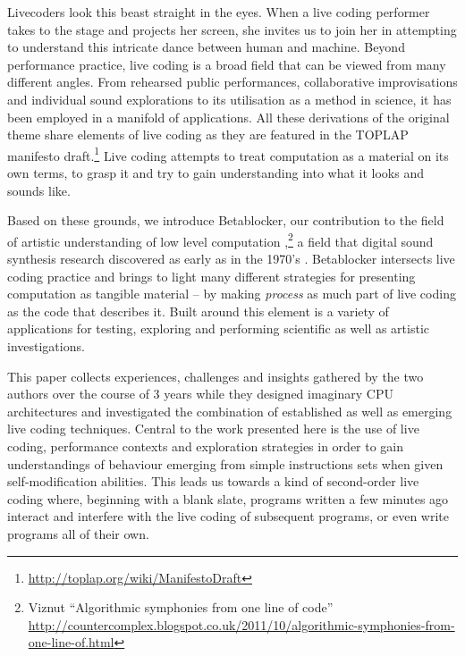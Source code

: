 \documentclass[letterpaper, 12pt]{article}
\begin{document}
Livecoders look this beast straight in the eyes.
When a live coding performer takes to the stage and projects her screen, she invites us to join her in attempting to understand this intricate dance between human and machine.
Beyond performance practice, live coding is a broad field that can be viewed from many different angles.
From rehearsed public performances, collaborative improvisations and individual sound explorations to its utilisation as a method in science, it has been employed in a manifold of applications.
All these derivations of the original theme share elements of live coding as they are featured in the TOPLAP manifesto draft.\footnote{\url{http://toplap.org/wiki/ManifestoDraft}} \citep{ward2004-liv}
Live coding attempts to treat computation as a material on its own terms, to grasp it and try to gain understanding into what it looks \citep{mclean2010-vis} and sounds like.

Based on these grounds, we introduce Betablocker, our contribution to the field of artistic understanding of low level computation \citep{2006-the},\footnote{Viznut ``Algorithmic symphonies from one line of code'' \url{http://countercomplex.blogspot.co.uk/2011/10/algorithmic-symphonies-from-one-line-of.html}} a field that digital sound synthesis research discovered as early as in the 1970's \citep{berg2009-com}.
Betablocker intersects live coding practice and brings to light many different strategies for presenting computation as tangible material -- by making \emph{process} as much part of live coding as the code that describes it.
Built around this element is a variety of applications for testing, exploring and performing scientific as well as artistic investigations.


This paper collects experiences, challenges and insights gathered by the two authors over the course of 3 years while they designed imaginary CPU architectures and investigated the combination of established as well as emerging live coding techniques.
Central to the work presented here is the use of live coding, performance contexts and exploration strategies in order to gain understandings of behaviour emerging from simple instructions sets when given self-modification abilities.
This leads us towards a kind of second-order live coding where, beginning with a blank slate, programs written a few minutes ago interact and interfere with the live coding of subsequent programs, or even write programs all of their own.
\parskip 18pt
\end{document}
